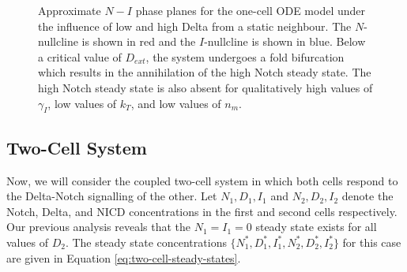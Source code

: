 \documentclass{article}
\begin{document}
\begin{flushleft}
\begin{figure}[!htp]
  \label{fig:one-cell-phase-plane}
  \centering
  \caption{Approximate $N-I$ phase planes for the one-cell ODE model under the influence of low and high Delta from a static neighbour. The $N$-nullcline is shown in red and the $I$-nullcline is shown in blue. Below a critical value of $D_{ext}$, the system undergoes a fold bifurcation which results in the annihilation of the high Notch steady state. The high Notch steady state is also absent for qualitatively high values of $\gamma_{I}$, low values of $k_{T}$, and low values of $n_{m}$.}
\end{figure}

\subsection*{Two-Cell System}

Now, we will consider the coupled two-cell system in which both cells respond to the Delta-Notch signalling of the other. Let $N_{1}, D_{1}, I_{1}$ and $N_{2}, D_{2}, I_{2}$ denote the Notch, Delta, and NICD concentrations in the first and second cells respectively. Our previous analysis reveals that the $N_{1} = I_{1} = 0$ steady state exists for all values of $D_{2}$. The steady state concentrations $\{ N_{1}^{*}, D_{1}^{*}, I_{1}^{*}, N_{2}^{*}, D_{2}^{*}, I_{2}^{*} \}$ for this case are given in Equation \ref{eq:two-cell-steady-states}.


\end{flushleft}
\end{document}
